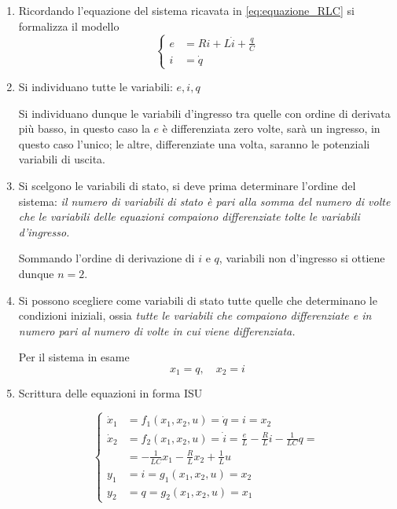 \begin{enumerate}
\item Ricordando l'equazione del sistema ricavata in \ref{eq:equazione_RLC}
si formalizza il modello
\begin{equation}\left\{
\begin{aligned}
 e &= R i + L\dot{i} + \frac{q}{C}\\
 i &= \dot{q}
\end{aligned}\right.\end{equation}
\item Si individuano tutte le variabili: $e,i,q$

Si individuano dunque le variabili d'ingresso tra quelle con ordine di derivata più basso, in
questo caso la $e$ è differenziata zero volte, sarà un ingresso, in questo caso l'unico; le altre,
differenziate una volta, saranno le potenziali variabili di uscita.
\item Si scelgono le variabili di stato, si deve prima determinare l'ordine del sistema:\newline
\emph{il
numero di variabili di stato è pari alla somma del numero di volte che le variabili delle equazioni
compaiono differenziate tolte le variabili d'ingresso.}

Sommando l'ordine di derivazione di $i$ e $q$, variabili non d'ingresso si ottiene dunque $n=2$.

\item Si possono scegliere come variabili di stato tutte quelle che determinano le condizioni
iniziali, ossia\newline
\emph{tutte le variabili che compaiono differenziate e in numero pari al numero di volte
in cui viene differenziata.}

Per il sistema in esame
$$
x_1 = q,\quad x_2 = i
$$
\item Scrittura delle equazioni in forma ISU

$$
\left\{\begin{aligned}
\dot{x}_1 &= f_1\left(x_1,x_2,u\right) = \dot{q} = i = x_2\\
\dot{x}_2 &=f_2(x_1,x_2,u) = \dot{i} = \frac{e}{L} - \frac{R}{L}i-\frac{1}{LC}q =\\
&= -\frac{1}{LC}x_1 - \frac{R}{L}x_2 + \frac{1}{L}u\\
y_1 &= i = g_1(x_1,x_2,u)=x_2\\
y_2 &=q = g_2(x_1,x_2,u)=x_1
\end{aligned}\right.
$$
\end{enumerate}

